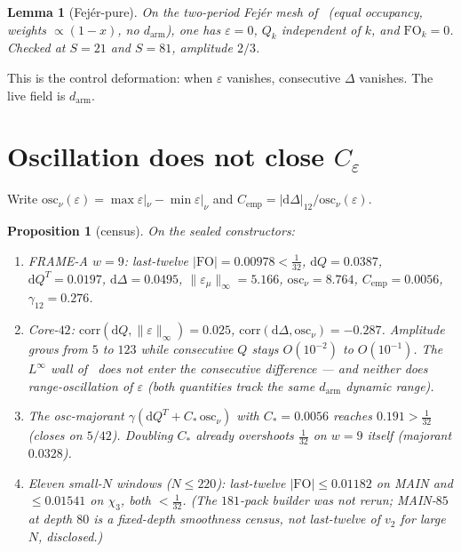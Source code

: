 \documentclass[11pt]{article}
\newtheorem{lemma}{Lemma}
\newtheorem{prop}{Proposition}
\theoremstyle{remark}
\begin{document}
\begin{lemma}[Fej\'er-pure]\label{lem:pure}
On the two-period Fej\'er mesh of~\cite{r382} (equal occupancy,
weights $\propto(1-x)$, no $d_{\mathrm{arm}}$), one has $\varepsilon=0$,
$Q_k$ independent of $k$, and $\mathrm{FO}_k=0$.
Checked at $S=21$ and $S=81$, amplitude $2/3$.
\end{lemma}

This is the control deformation: when $\varepsilon$ vanishes, consecutive
$\Delta$ vanishes.  The live field is $d_{\mathrm{arm}}$.

\section{Oscillation does not close $C_\varepsilon$}\label{sec:osc}

Write $\mathrm{osc}_\nu(\varepsilon)=\max\varepsilon|_\nu-\min\varepsilon|_\nu$
and $C_{\mathrm{emp}}=\lvert\mathrm{d}\Delta\rvert_{12}/\mathrm{osc}_\nu(\varepsilon)$.

\begin{prop}[census]\label{prop:census}
On the sealed constructors:
\begin{enumerate}
\item FRAME-A $w=9$: last-twelve
  $\lvert\mathrm{FO}\rvert=0.00978<\tfrac1{32}$,
  $\mathrm{d}Q=0.0387$, $\mathrm{d}Q^T=0.0197$,
  $\mathrm{d}\Delta=0.0495$, $\lVert\varepsilon_\mu\rVert_\infty=5.166$,
  $\mathrm{osc}_\nu=8.764$, $C_{\mathrm{emp}}=0.0056$,
  $\gamma_{12}=0.276$.
\item Core-$42$: $\mathrm{corr}(\mathrm{d}Q,\lVert\varepsilon\rVert_\infty)=0.025$,
  $\mathrm{corr}(\mathrm{d}\Delta,\mathrm{osc}_\nu)=-0.287$.
  Amplitude grows from $5$ to $123$ while consecutive $Q$ stays $O(10^{-2})$
  to $O(10^{-1})$.  The $L^\infty$ wall of~\cite{r381} does not enter the
  consecutive difference --- and neither does range-oscillation of
  $\varepsilon$ (both quantities track the same $d_{\mathrm{arm}}$
  dynamic range).
\item The osc-majorant
  $\gamma(\mathrm{d}Q^T+C_*\,\mathrm{osc}_\nu)$ with $C_*=0.0056$
  reaches $0.191>\tfrac1{32}$ (closes on $5/42$).
  Doubling $C_*$ already overshoots $\tfrac1{32}$ on $w=9$ itself
  (majorant $0.0328$).
\item Eleven small-$N$ windows ($N\le 220$): last-twelve
  $\lvert\mathrm{FO}\rvert\le 0.01182$ on MAIN and $\le 0.01541$ on
  $\chi_3$, both $<\tfrac1{32}$.
  (The $181$-pack builder was not rerun; MAIN-$85$ at depth $80$ is a
  fixed-depth smoothness census, not last-twelve of $v_2$ for large $N$,
  disclosed.)
\end{enumerate}
\end{prop}
\end{document}
